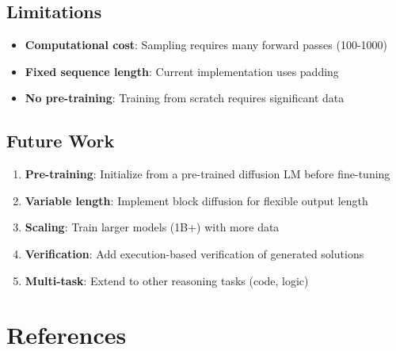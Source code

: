 \documentclass[11pt,a4paper]{article}
\begin{document}
\subsection{Limitations}

\begin{itemize}
    \item \textbf{Computational cost}: Sampling requires many forward passes (100-1000)
    \item \textbf{Fixed sequence length}: Current implementation uses padding
    \item \textbf{No pre-training}: Training from scratch requires significant data
\end{itemize}

\subsection{Future Work}

\begin{enumerate}
    \item \textbf{Pre-training}: Initialize from a pre-trained diffusion LM before fine-tuning
    \item \textbf{Variable length}: Implement block diffusion for flexible output length
    \item \textbf{Scaling}: Train larger models (1B+) with more data
    \item \textbf{Verification}: Add execution-based verification of generated solutions
    \item \textbf{Multi-task}: Extend to other reasoning tasks (code, logic)
\end{enumerate}

\section{References}
\end{document}
